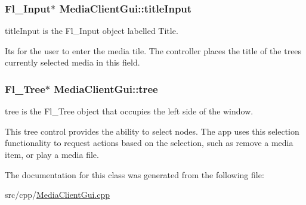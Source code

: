 \subsubsection[{title\+Input}]{\setlength{\rightskip}{0pt plus 5cm}Fl\+\_\+\+Input$\ast$ Media\+Client\+Gui\+::title\+Input\hspace{0.3cm}{\ttfamily [protected]}}\label{class_media_client_gui_a3e4fe22653dbf41f11c14f5a572e79c8}


title\+Input is the Fl\+\_\+\+Input object labelled Title. 

Its for the user to enter the media tile. The controller places the title of the tree\textquotesingle{}s currently selected media in this field. \hypertarget{class_media_client_gui_a271cf7771f269da55fbe873f17238ab2}{}
\subsubsection[{tree}]{\setlength{\rightskip}{0pt plus 5cm}Fl\+\_\+\+Tree$\ast$ Media\+Client\+Gui\+::tree\hspace{0.3cm}{\ttfamily [protected]}}\label{class_media_client_gui_a271cf7771f269da55fbe873f17238ab2}


tree is the Fl\+\_\+\+Tree object that occupies the left side of the window. 

This tree control provides the ability to select nodes. The app uses this selection functionality to request actions based on the selection, such as remove a media item, or play a media file. 

The documentation for this class was generated from the following file\+:\begin{DoxyCompactItemize}
\item 
src/cpp/\hyperlink{_media_client_gui_8cpp}{Media\+Client\+Gui.\+cpp}\end{DoxyCompactItemize}
